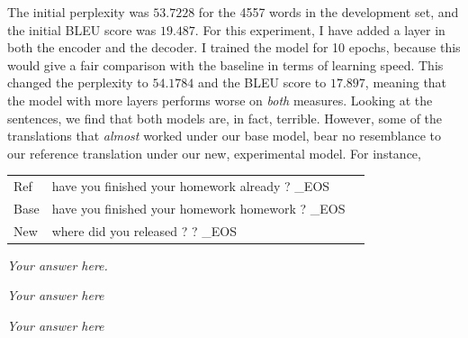 \documentclass[answers]{exam}
\begin{document}
\begin{CJK}{UTF8}{min}
\begin{questions}
\begin{framed}
  The initial perplexity was $53.7228$ for the 4557 words in the development
  set, and the initial BLEU score was $19.487$. For this experiment, I have
  added a layer in both the encoder and the decoder. I trained the model for
  10 epochs, because this would give a fair comparison with the baseline in
  terms of learning speed.
  This changed the perplexity to $54.1784$ and the BLEU score to $17.897$,
  meaning that the model with more layers performs worse on \emph{both}
  measures. 
  Looking at the sentences, we find that both models are, in fact, terrible.
  However, some of the translations that \emph{almost} worked under our base
  model, bear no resemblance to our reference translation under our new,
  experimental model. For instance,
  \begin{tabular}{lll}
    Ref & have you finished your homework already ? \_EOS  \\
    Base& have you finished your homework homework ? \_EOS \\
    New & where did you released ? ? \_EOS
  \end{tabular}
\end{framed}


\begin{framed}
\emph{Your answer here.}
\end{framed}



\begin{framed}
\emph{Your answer here}
\end{framed}

\begin{framed}
\emph{Your answer here}
\end{framed}
\end{questions}

\noindent \hrulefill

\clearpage





\end{CJK}
\end{document}
